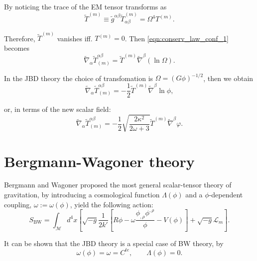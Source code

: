 By noticing the trace of the EM tensor transforms as
\begin{equation}
    \tilde{T}^{(m)} \equiv \tilde{g}^{\alpha\beta} \tilde{T}_{\alpha\beta}^{(m)}=\Omega^{4} T^{(m)} .
\end{equation}

Therefore, $\tilde{T}^{(m)}$ vanishes iff. $T^{(m)}=0$. Then \cref{eqn:conserv_law_conf_1} becomes
\begin{equation}
    \tilde{\nabla}_\alpha \tilde{T}_{(m)}^{\alpha\beta}=\tilde{T}^{(m)}\tilde{\nabla}^\beta(\ln \Omega).
\end{equation}


In the JBD theory the choice of transfomation is $\Omega=(G \phi)^{-1/2}$, then we obtain
\begin{equation}
    \tilde{\nabla}_\alpha \tilde{T}_{(m)}^{\alpha\beta}=-\frac{1}{2} \tilde{T}^{(m)} \tilde{\nabla}^\beta \ln\phi,
\end{equation}


or, in terms of the new scalar field:
\begin{equation}
    \tilde{\nabla}_\alpha \tilde{T}_{(m)}^{\alpha\beta}=-\frac{1}{2}\sqrt{\frac{2\kappa^2}{2\omega+3}} \tilde{T}^{(m)} \tilde{\nabla}^\beta \varphi.
\end{equation}


\section{Bergmann-Wagoner theory}

Bergmann \cite{Bergmann1968} and Wagoner \cite{wagoner1970} proposed the most general scalar-tensor theory of gravitation, by introducing a cosmological function $\Lambda(\phi)$ and a $\phi$-dependent coupling, $\omega:=\omega(\phi)$, yield the following action:
\begin{equation}
    S_{\text{BW}}=\int_{\mathcal{M}} d^4x\left[ \sqrt{-g}\frac{1}{2k'}\left[R\phi-\omega \frac{\phi_{,\rho}\phi^{,\rho}}{\phi}-V(\phi)\right]+\sqrt{-g}\mathcal{L}_m\right].
    \label{eqn:BD_action_JF}
\end{equation}

It can be shown that the JBD theory is a special case of BW theory, by
\begin{equation}
    \omega(\phi)=\omega=C^{te},\qquad \Lambda(\phi)=0.
\end{equation}

